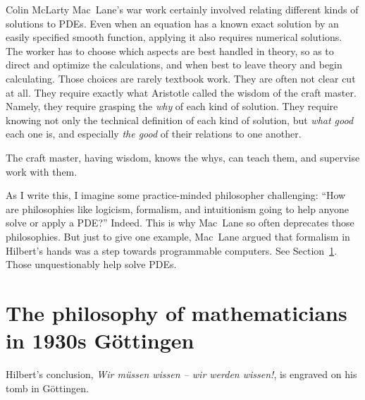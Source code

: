 \begin{artengenv}{Colin McLarty}
Mac~Lane's war work certainly involved relating different kinds of solutions to PDEs.  Even when an equation has a known exact solution by an easily specified smooth function, applying it also requires numerical solutions.  The worker has to choose which aspects are best handled in theory, so as to direct and optimize the calculations, and when best to leave theory and begin calculating.  Those choices are rarely textbook work. They are often not clear cut at all.  They require exactly what Aristotle called the wisdom of the craft master. Namely, they require grasping the \textit{why} of each kind of solution.  They require knowing not only the technical definition of each kind of solution, but \textit{what good} each one is, and especially \textit{the good} of their relations to one another.

The craft master, having wisdom, knows the whys, can teach them, and supervise work with them.

As I write this, I imagine some practice-minded philosopher challenging: ``How are philosophies like logicism, formalism, and intuitionism going to help anyone solve or apply a PDE?'' Indeed. This is why Mac~Lane so often deprecates those philosophies.  But just to give one example, Mac~Lane argued that formalism in Hilbert's hands was a step towards programmable computers. See Section~\ref{S:Learning}.  Those unquestionably help solve PDEs.

\section{The philosophy of mathematicians\\in 1930s G\"ottingen}\label{S:Learning}

Hilbert's conclusion, \textit{Wir m\"ussen wissen -- wir werden wissen!}, is engraved on his tomb in G\"ottingen.



\end{artengenv}
